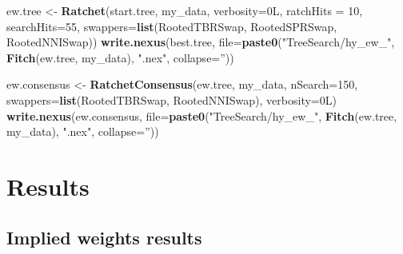 \documentclass[]{book}
\newenvironment{Shaded}{\begin{snugshade}}{\end{snugshade}}
\newcommand{\KeywordTok}[1]{\textcolor[rgb]{0.13,0.29,0.53}{\textbf{#1}}}
\newcommand{\DataTypeTok}[1]{\textcolor[rgb]{0.13,0.29,0.53}{#1}}
\newcommand{\DecValTok}[1]{\textcolor[rgb]{0.00,0.00,0.81}{#1}}
\newcommand{\StringTok}[1]{\textcolor[rgb]{0.31,0.60,0.02}{#1}}
\newcommand{\NormalTok}[1]{#1}
\theoremstyle{definition}
\theoremstyle{definition}
\theoremstyle{definition}
\theoremstyle{remark}
\begin{document}
\begin{Shaded}
\begin{Highlighting}[]
\NormalTok{ew.tree <-}\StringTok{ }\KeywordTok{Ratchet}\NormalTok{(start.tree, my_data, }\DataTypeTok{verbosity=}\NormalTok{0L,}
                   \DataTypeTok{ratchHits =} \DecValTok{10}\NormalTok{, }\DataTypeTok{searchHits=}\DecValTok{55}\NormalTok{,}
                   \DataTypeTok{swappers=}\KeywordTok{list}\NormalTok{(RootedTBRSwap, RootedSPRSwap, RootedNNISwap))}
\KeywordTok{write.nexus}\NormalTok{(best.tree, }\DataTypeTok{file=}\KeywordTok{paste0}\NormalTok{(}\StringTok{"TreeSearch/hy_ew_"}\NormalTok{, }\KeywordTok{Fitch}\NormalTok{(ew.tree, my_data), }\StringTok{".nex"}\NormalTok{, }\DataTypeTok{collapse=}\StringTok{''}\NormalTok{))}

\NormalTok{ew.consensus <-}\StringTok{ }\KeywordTok{RatchetConsensus}\NormalTok{(ew.tree, my_data, }\DataTypeTok{nSearch=}\DecValTok{150}\NormalTok{,}
                                 \DataTypeTok{swappers=}\KeywordTok{list}\NormalTok{(RootedTBRSwap, RootedNNISwap),}
                                 \DataTypeTok{verbosity=}\NormalTok{0L)}
\KeywordTok{write.nexus}\NormalTok{(ew.consensus, }\DataTypeTok{file=}\KeywordTok{paste0}\NormalTok{(}\StringTok{"TreeSearch/hy_ew_"}\NormalTok{, }\KeywordTok{Fitch}\NormalTok{(ew.tree, my_data), }\StringTok{".nex"}\NormalTok{, }\DataTypeTok{collapse=}\StringTok{''}\NormalTok{))}
\end{Highlighting}
\end{Shaded}

\hypertarget{results}{%
\section{Results}\label{results}}

\hypertarget{implied-weights-results}{%
\subsection{Implied weights results}\label{implied-weights-results}}
\end{document}
